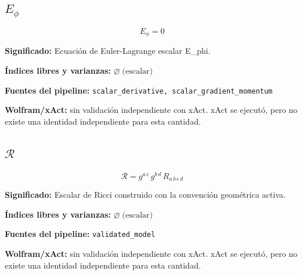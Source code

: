 \documentclass[11pt]{article}
\begin{document}
\subsection*{$ E_{\phi} $}
\begin{dmath*}[breakdepth={5}]
E_{\phi} = 0
\end{dmath*}
\par\vspace{1.2\baselineskip}\noindent
\begin{minipage}{\linewidth}
\textbf{Significado:} Ecuación de Euler-Lagrange escalar E\_phi.\par
\textbf{Índices libres y varianzas:} $ \varnothing\;\text{(escalar)} $\par
\textbf{Fuentes del pipeline:} \texttt{scalar\_derivative, scalar\_gradient\_momentum}\par
\textbf{Wolfram/xAct:} sin validación independiente con xAct. xAct se ejecutó, pero no existe una identidad independiente para esta cantidad.\par
\end{minipage}
\subsection*{$ \mathcal{R} $}
\begin{dmath*}[breakdepth={5}]
\mathcal{R} = g{}^{a\,c}\,g{}^{b\,d}\,R{}_{a\,b\,c\,d}
\end{dmath*}
\par\vspace{1.2\baselineskip}\noindent
\begin{minipage}{\linewidth}
\textbf{Significado:} Escalar de Ricci construido con la convención geométrica activa.\par
\textbf{Índices libres y varianzas:} $ \varnothing\;\text{(escalar)} $\par
\textbf{Fuentes del pipeline:} \texttt{validated\_model}\par
\textbf{Wolfram/xAct:} sin validación independiente con xAct. xAct se ejecutó, pero no existe una identidad independiente para esta cantidad.\par
\end{minipage}
\end{document}
